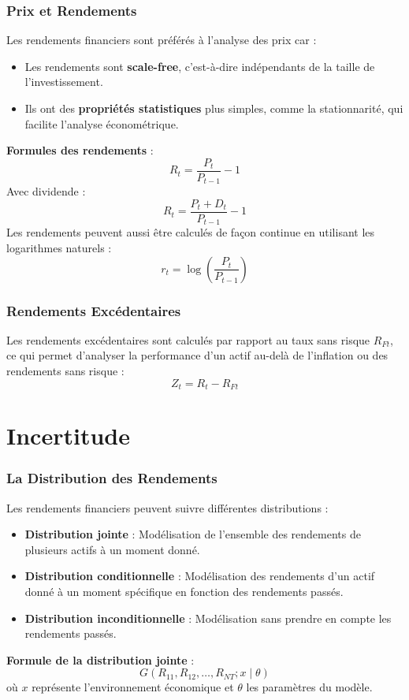 \documentclass{beamer}
\begin{document}
\begin{frame}
  \frametitle{Prix et Rendements}
  Les rendements financiers sont préférés à l’analyse des prix car :
  \begin{itemize}
    \item Les rendements sont \textbf{scale-free}, c'est-à-dire indépendants de la taille de l'investissement.
    \item Ils ont des \textbf{propriétés statistiques} plus simples, comme la stationnarité, qui facilite l'analyse économétrique.
  \end{itemize}
  \textbf{Formules des rendements} :
  \begin{equation}
    R_t = \frac{P_t}{P_{t-1}} - 1
  \end{equation}
  Avec dividende :
  \begin{equation}
    R_t = \frac{P_t + D_t}{P_{t-1}} - 1
  \end{equation}
  Les rendements peuvent aussi être calculés de façon continue en utilisant les logarithmes naturels :
  \begin{equation}
    r_t = \log \left( \frac{P_t}{P_{t-1}} \right)
  \end{equation}
\end{frame}

\begin{frame}
  \frametitle{Rendements Excédentaires}
  Les rendements excédentaires sont calculés par rapport au taux sans risque \( R_{Ft} \), ce qui permet d'analyser la performance d'un actif au-delà de l'inflation ou des rendements sans risque :
  \begin{equation}
    Z_t = R_t - R_{Ft}
  \end{equation}
\end{frame}

\section{Incertitude}

\begin{frame}
  \frametitle{La Distribution des Rendements}
  Les rendements financiers peuvent suivre différentes distributions :
  \begin{itemize}
    \item \textbf{Distribution jointe} : Modélisation de l'ensemble des rendements de plusieurs actifs à un moment donné.
    \item \textbf{Distribution conditionnelle} : Modélisation des rendements d'un actif donné à un moment spécifique en fonction des rendements passés.
    \item \textbf{Distribution inconditionnelle} : Modélisation sans prendre en compte les rendements passés.
  \end{itemize}
  \textbf{Formule de la distribution jointe} :
  \[
    G(R_{11}, R_{12}, \dots, R_{NT}; x \mid \theta)
  \]
  où \( x \) représente l'environnement économique et \( \theta \) les paramètres du modèle.
\end{frame}
\end{document}
